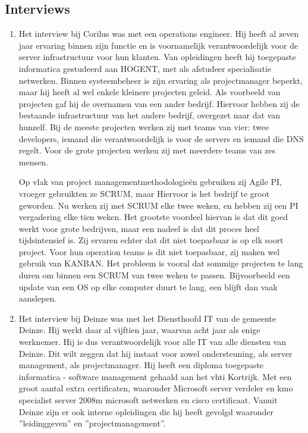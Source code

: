 \documentclass{article}
\begin{document}
    \subsection{Interviews}
    \begin{enumerate}
        \item Het interview bij Corilus was met een operations engineer. Hij heeft al zeven jaar ervaring binnen zijn 
        functie en is voornamelijk verantwoordelijk voor de server infrastructuur voor hun klanten. Van opleidingen
        heeft hij toegepaste informatica gestudeerd aan HOGENT, met als afstudeer specialisatie netwerken. Binnen
        systeembeheer is zijn ervaring als projectmanager beperkt, maar hij heeft al wel enkele kleinere projecten
        geleid. Als voorbeeld van projecten gaf hij de overnamen van een ander bedrijf. Hiervoor hebben
        zij de bestaande infrastructuur van het andere bedrijf, overgezet naar dat van hunzelf. Bij de meeste
        projecten werken zij met teams van vier: twee developers, iemand die verantwoordelijk is voor de servers en
        iemand die DNS regelt. Voor de grote projecten werken zij met meerdere teams van zes mensen.

        Op vlak van project managementmethodologieën gebruiken zij Agile PI, vroeger gebruikten ze SCRUM, maar Hiervoor
        is het bedrijf te groot geworden. Nu werken zij met SCRUM elke twee weken, en hebben zij een PI vergadering elke
        tien weken. Het grootste voordeel hiervan is dat dit goed werkt voor grote bedrijven, maar een nadeel is dat
        dit proces heel tijdsintensief is. Zij ervaren echter dat dit niet toepasbaar is op elk soort project. Voor
        hun operation teams is dit niet toepasbaar, zij maken wel gebruik van KANBAN. Het probleem is vooral dat sommige
        projecten te lang duren om binnen een SCRUM van twee weken te passen. Bijvoorbeeld een update van een OS op elke
        computer duurt te lang, een blijft dan vaak aanslepen.

        \item Het interview bij Deinze was met het Diensthoofd IT van de gemeente Deinze. 
        Hij werkt daar al vijftien jaar, waarvan acht jaar als enige werknemer.
        Hij is dus verantwoordelijk voor alle IT van alle diensten van Deinze.
        Dit wilt zeggen dat hij instaat voor zowel ondersteuning, als server management, als projectmanager.
        Hij heeft een diploma toegepaste informatica - software management gehaald aan het vhti Kortrijk.
        Met een groot aantal extra certificaten, waaronder Microsoft server verdeler en kmo specialist server 2008m
        microsoft netwerken en cisco certificaat.
        Vanuit Deinze zijn er ook interne opleidingen die hij heeft gevolgd 
        waaronder ''leidinggeven'' en ''projectmanagement''.
        

\end{enumerate}
\end{document}
